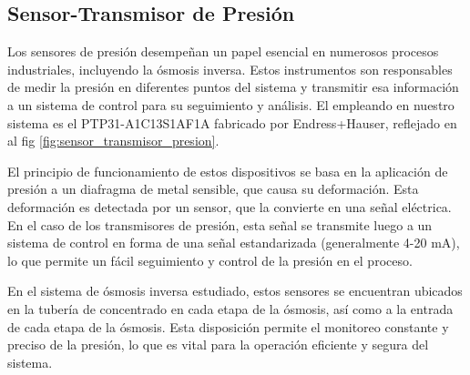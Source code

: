 \subsection{Sensor-Transmisor de Presión} \label{sec:sensor_presion}

Los sensores de presión desempeñan un papel esencial en numerosos procesos industriales,
incluyendo la ósmosis inversa. Estos instrumentos son responsables de medir la presión en diferentes puntos
del sistema y transmitir esa información a un sistema de control para su seguimiento y análisis. El empleando
en nuestro sistema es el PTP31-A1C13S1AF1A fabricado por Endress+Hauser, reflejado en al fig \ref{fig:sensor_transmisor_presion}.

El principio de funcionamiento de estos dispositivos se basa en la aplicación de presión a un diafragma de
metal sensible, que causa su deformación. Esta deformación es detectada por un sensor, que la convierte en
una señal eléctrica. En el caso de los transmisores de presión, esta señal se transmite luego a un sistema de control en forma
de una señal estandarizada (generalmente 4-20 mA), lo que permite un fácil seguimiento y control de la presión en el proceso.

En el sistema de ósmosis inversa estudiado, estos sensores se encuentran
ubicados en la tubería de concentrado en cada etapa de la ósmosis, así como a la entrada de cada etapa
de la ósmosis. Esta disposición permite el monitoreo constante y preciso de la presión, lo que es
vital para la operación eficiente y segura del sistema.



